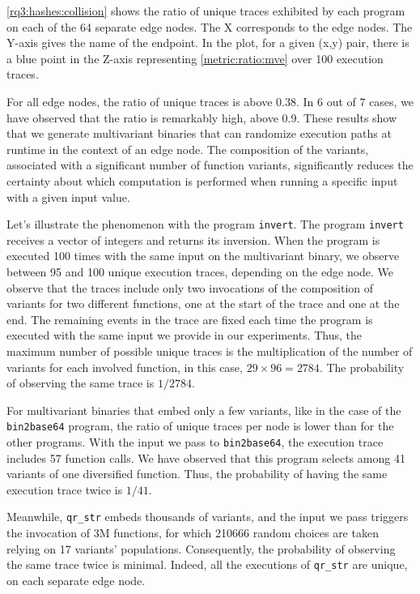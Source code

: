 \autoref{rq3:hashes:collision} shows the ratio of unique traces exhibited by each program on each of the 64 separate edge nodes. 
The X corresponds to the edge nodes.
The Y-axis gives the name of the endpoint.
In the plot, for a given (x,y) pair, there is a blue point in the Z-axis representing \autoref{metric:ratio:mve} over 100 execution traces.

For all edge nodes, the ratio of unique traces is above 0.38.
In 6 out of 7 cases, we have observed that the ratio is remarkably high, above 0.9.
These results show that we generate multivariant binaries that can randomize execution paths at runtime in the context of an edge node. The composition of the variants, associated with a significant number of function variants, significantly reduces the certainty about which computation is performed when running a specific input with a given input value.

Let's illustrate the phenomenon with the program \texttt{invert}.
The program \texttt{invert} receives a vector of integers and returns its inversion.
When the program is executed 100 times with the same input on the multivariant binary, we observe between 95 and 100 unique execution traces, depending on the edge node.
We observe that the traces include only two invocations of the composition of variants for two different functions, one at the start of the trace and one at the end.
The remaining events in the trace are fixed each time the program is executed with the same input we provide in our experiments.
Thus, the maximum number of possible unique traces is the multiplication of the number of variants for each involved function, in this case, $29\times96=2784$. The probability of observing the same trace is $1/2784$.


For multivariant binaries that embed only a few variants, like in the case of the \texttt{bin2base64} program, the ratio of unique traces per node is lower than for the other programs.
With the input we pass to \texttt{bin2base64}, the execution trace includes 57 function calls.
We have observed that this program selects among 41 variants of one diversified function. Thus, the probability of having the same execution trace twice is $1/41$. 


Meanwhile, \texttt{qr\_str} embeds thousands of variants, and the input we pass triggers the invocation of 3M functions, for which 210666 random choices are taken relying on 17 variants' populations. Consequently, the probability of observing the same trace twice is minimal. Indeed, all the executions of \texttt{qr\_str} are unique, on each separate edge node.


